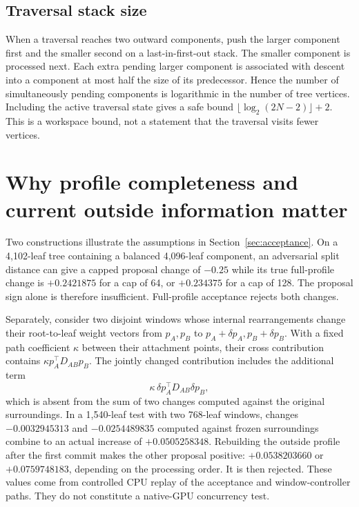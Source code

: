 \subsection{Traversal stack size}

When a traversal reaches two outward components, push the larger component first and the smaller second on a last-in-first-out stack.
The smaller component is processed next.
Each extra pending larger component is associated with descent into a component at most half the size of its predecessor.
Hence the number of simultaneously pending components is logarithmic in the number of tree vertices.
Including the active traversal state gives a safe bound
$\lfloor\log_2(2N-2)\rfloor+2$.
This is a workspace bound, not a statement that the traversal visits fewer vertices.

\section{Why profile completeness and current outside information matter}
\label{sec:counterexamples}

Two constructions illustrate the assumptions in Section~\ref{sec:acceptance}.
On a 4,102-leaf tree containing a balanced 4,096-leaf component, an adversarial split distance can give a capped proposal change of $-0.25$ while its true full-profile change is $+0.2421875$ for a cap of 64, or $+0.234375$ for a cap of 128.
The proposal sign alone is therefore insufficient.
Full-profile acceptance rejects both changes.

Separately, consider two disjoint windows whose internal rearrangements change their root-to-leaf weight vectors from $p_A,p_B$ to $p_A+\delta p_A,p_B+\delta p_B$.
With a fixed path coefficient $\kappa$ between their attachment points, their cross contribution contains
$\kappa p_A^\top D_{AB}p_B$.
The jointly changed contribution includes the additional term
\[
 \kappa\,\delta p_A^\top D_{AB}\delta p_B,
\]
which is absent from the sum of two changes computed against the original surroundings.
In a 1,540-leaf test with two 768-leaf windows, changes
$-0.0032945313$ and $-0.0254489835$ computed against frozen surroundings combine to an actual increase of $+0.0505258348$.
Rebuilding the outside profile after the first commit makes the other proposal positive:
$+0.0538203660$ or $+0.0759748183$, depending on the processing order.
It is then rejected.
These values come from controlled CPU replay of the acceptance and window-controller paths.
They do not constitute a native-GPU concurrency test.

